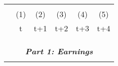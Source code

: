 
    \begin{tabular}{lccccc} \hline
    \vspace{-2pt} & \vspace{-2pt} & \vspace{-2pt} & \vspace{-2pt} & \vspace{-2pt} \\
     & (1) & (2) & (3) & (4) & (5) \\
     & t & t+1 & t+2 & t+3 & t+4 \\ 
     
    \vspace{-2pt} & \vspace{-2pt} & \vspace{-2pt} & \vspace{-2pt} & \vspace{-2pt} \\\hline
    \vspace{-1.5pt} & \vspace{-1.5pt} & \vspace{-1.5pt} & \vspace{-1.5pt} & \vspace{-1.5pt} \\
    \cmidrule{1-6}
    \vspace{-1.5pt} & \vspace{-1.5pt} & \vspace{-1.5pt} & \vspace{-1.5pt} & \vspace{-1.5pt} \\
    \multicolumn{6}{c}{\textit{\textbf{Part 1: Earnings}}} \\ 
    \vspace{-1.5pt} & \vspace{-1.5pt} & \vspace{-1.5pt} & \vspace{-1.5pt} & \vspace{-1.5pt} \\ 


\end{tabular}
